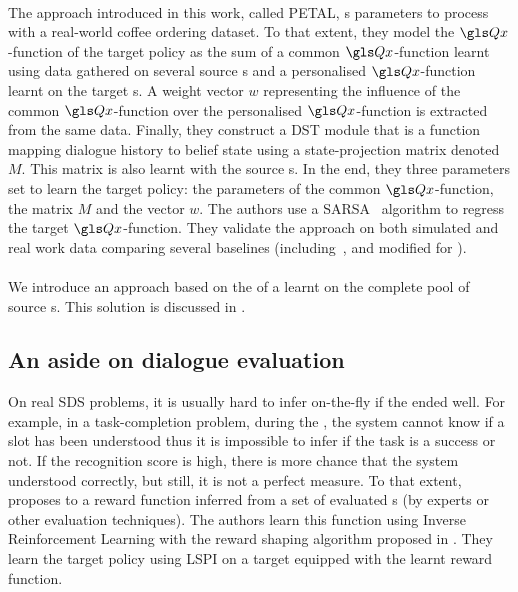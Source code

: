 \paragraph{\cite{Mo2018-tl-dialogue-PETAL}} The approach introduced in this work, called PETAL, s parameters to process   with a real-world coffee ordering dataset. To that extent, they model the $\Q$-function of the target policy as the sum of a common $\Q$-function learnt using data gathered on several source s and a personalised $\Q$-function learnt on the target s. A weight vector $w$ representing the influence of the common $\Q$-function over the personalised $\Q$-function is extracted from the same data. Finally, they construct a \gls{DST} module that is a function mapping dialogue history to belief state using a state-projection matrix denoted $M$. This matrix is also learnt with the source s. In the end, they  three parameters set to learn the target policy: the parameters of the common $\Q$-function, the matrix $M$ and the vector $w$. The authors use a \gls{SARSA}~\parencite{rummery1994line} algorithm to regress the target $\Q$-function. They validate the approach on both simulated and real work data comparing several baselines (including~\textcite{casanueva2015-tl-dialogue}, \textcite{Genevay2016} and \textcite{Gasic2013} modified for  ).

\paragraph{\cite{carrara2018safe}} We introduce an approach based on the  of a  learnt on the complete pool of source s. This solution is discussed in .

\subsection{An aside on dialogue evaluation}

On real \gls{SDS} problems, it is usually hard to infer on-the-fly if the  ended well. For example, in a task-completion problem, during the , the system cannot know if a slot has been understood thus it is impossible to infer if the task is a success or not. If the recognition score is high, there is more chance that the system understood correctly, but still, it is not a perfect measure. To that extent, \textcite{elasri2014-tl-dialogue} proposes to  a reward function inferred from a set of evaluated s (by experts or other evaluation techniques). The authors learn this function using Inverse Reinforcement Learning with the reward shaping algorithm proposed in \textcite{ElAsri2012-reward-shapping-dl}. They learn the target policy using \gls{LSPI} on a target  equipped with the learnt reward function.

